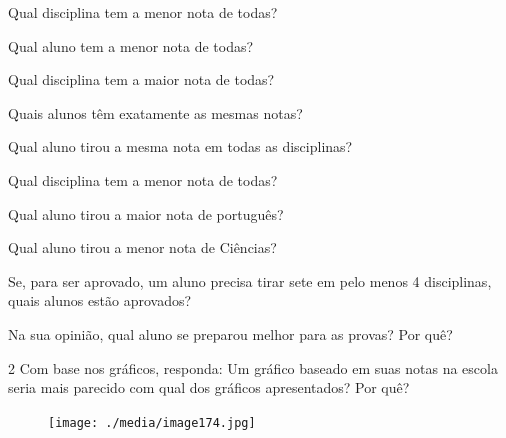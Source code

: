 \begin{escolha}[itemsep=-5pt]
\item Qual disciplina tem a menor nota de todas?


\item Qual aluno tem a menor nota de todas?


\item Qual disciplina tem a maior nota de todas?


\item Quais alunos têm exatamente as mesmas notas?


\item Qual aluno tirou a mesma nota em todas as disciplinas?


\item Qual disciplina tem a menor nota de todas?


\item Qual aluno tirou a maior nota de português?


\item Qual aluno tirou a menor nota de Ciências?


\item Se, para ser aprovado, um aluno precisa tirar sete em pelo menos 4 disciplinas, quais alunos estão aprovados?


\item Na sua opinião, qual aluno se preparou melhor para as provas? Por quê?

\end{escolha}

\num{2} Com base nos gráficos, responda:
Um gráfico baseado em suas notas na escola seria mais parecido com qual dos gráficos apresentados? Por quê?

\begin{figure}[H]
\centering
\texttt{[image: ./media/image174.jpg]}
\end{figure}

